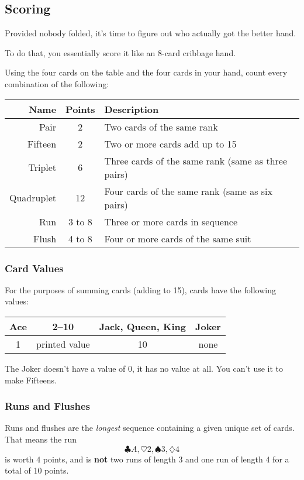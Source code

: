 \subsection{Scoring}
Provided nobody folded, it's time to figure out who actually got the better hand.

To do that, you essentially score it like an 8-card cribbage hand.

Using the four cards on the table and the four cards in your hand, count every combination of the following:

\begin{center}
    \begin{tabular}{r|c|l}
        Name & Points & Description\\\hline
        Pair & 2 & Two cards of the same rank\\
        Fifteen & 2 & Two or more cards add up to 15\\
        Triplet & 6 & Three cards of the same rank (same as three pairs)\\
        Quadruplet & 12 & Four cards of the same rank (same as six pairs)\\
        Run & 3 to 8 & Three or more cards in sequence\\
        Flush & 4 to 8 & Four or more cards of the same suit\\
    \end{tabular}
\end{center}

\subsubsection{Card Values}
For the purposes of summing cards (adding to 15), cards have the following values:
\begin{center}
    \begin{tabular}{c|c|c|c}
        Ace & 2--10 & Jack, Queen, King & Joker\\\hline
        1 & printed value & 10 & none\\ 
    \end{tabular}
\end{center}
\note The Joker doesn't have a value of 0, it has no value at all. You can't use it to make Fifteens.

\subsubsection{Runs and Flushes}
Runs and flushes are the \textit{longest} sequence containing a given unique set of cards. That means the run \[\clubsuit A, \heartsuit 2, \spadesuit 3, \diamondsuit 4\] is worth 4 points, and is \textbf{not} two runs of length 3 and one run of length 4 for a total of 10 points.

